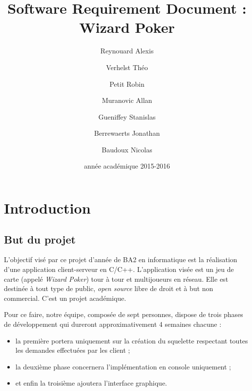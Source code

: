 \documentclass{article}
\title{Software Requirement Document : Wizard Poker}
\author{Reynouard Alexis \and Verhelst Théo \and Petit Robin \and Muranovic Allan \and Gueniffey Stanislas \and Berrewaerts Jonathan \and Baudoux Nicolas}
\date{année académique 2015-2016}
\begin{document}
\maketitle
\tableofcontents
\newpage
{}

\section{Introduction}
    \subsection{But du projet}
        L'objectif visé par ce projet d'année de BA2 en informatique est la réalisation d'une application client-serveur en C/C++. L'application visée est
        un jeu de carte (appelé \textit{Wizard Poker}) tour à tour et multijoueurs en réseau. Elle est destinée à tout type de public, \textit{open source}
        libre de droit et à but non commercial. C'est un projet académique.  %

        Pour ce faire, notre équipe, composée de sept personnes, dispose de trois phases de développement qui dureront approximativement 4 semaines chacune :
        \begin{itemize}
            \item la première portera uniquement sur la création du squelette respectant toutes les demandes effectuées par les client ;
            \item la deuxième phase concernera l'implémentation en console uniquement ;
            \item et enfin la troisième ajoutera l'interface graphique.
        \end{itemize}
\end{document}
